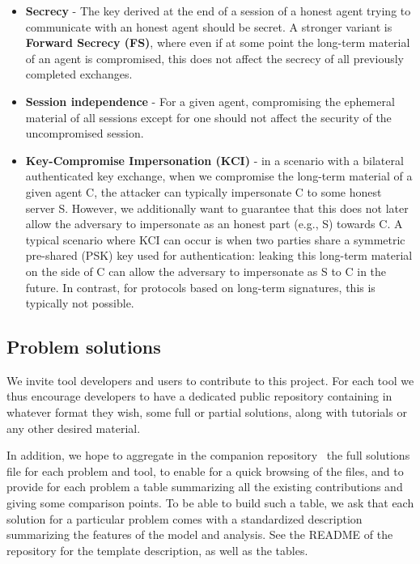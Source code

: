 \documentclass[11pt]{article}
\begin{document}
\begin{itemize}
\item \textbf{Secrecy} - The key derived at the end of a session of a honest agent trying to communicate with an honest agent should be secret. A stronger variant is \textbf{Forward Secrecy (FS)}, where even if at some point the long-term material of an agent is compromised, this does not affect the secrecy of all previously completed exchanges.
\item \textbf{Session independence} - For a given agent, compromising the ephemeral material of all sessions except for one should not affect the security of the uncompromised session.
\item \textbf{Key-Compromise Impersonation (KCI)} - in a scenario with a bilateral authenticated key exchange, when we compromise the long-term material of a given agent C, the attacker can typically impersonate C to some honest server S. However, we additionally want to guarantee that this does not later allow the adversary to impersonate as an honest part (e.g., S) towards C.
  A typical scenario where KCI can occur is when two parties share a symmetric pre-shared (PSK) key used for authentication: leaking this long-term material on the side of C can allow the adversary to impersonate as S to C in the future. In contrast, for protocols based on long-term signatures, this is typically not possible.
\end{itemize}


\subsection{Problem solutions}

We invite tool developers and users to contribute to this project. For each tool we thus encourage developers to have a dedicated public repository containing in whatever format they wish, some full or partial solutions, along with tutorials or any other desired material.


In addition, we hope to aggregate in the companion repository~\cite{ladder-repo} the full solutions file for each problem and tool, to enable for a quick browsing of the files, and to provide for each problem a table summarizing all the existing contributions and giving some comparison points. To be able to build such a table, we ask that each solution for a particular problem comes with a standardized description summarizing the features of the model and analysis. See the README of the repository for the template description, as well as the tables.
\end{document}
